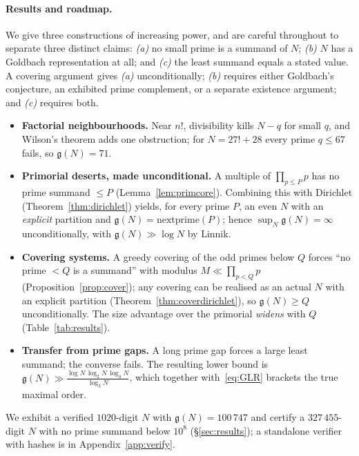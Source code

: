 \documentclass[11pt]{article}
\theoremstyle{plain}
\theoremstyle{definition}
\theoremstyle{remark}
\newcommand{\N}{N}
\newcommand{\g}{\mathfrak{g}}
\begin{document}
\paragraph{Results and roadmap.} We give three constructions of increasing power,
and are careful throughout to separate three distinct claims: \emph{(a)} no small
prime is a summand of $\N$; \emph{(b)} $\N$ has a Goldbach representation at all;
and \emph{(c)} the least summand equals a stated value. A covering argument gives
\emph{(a)} unconditionally; \emph{(b)} requires either Goldbach's conjecture, an
exhibited prime complement, or a separate existence argument; and \emph{(c)}
requires both.
\begin{itemize}
\item[\S\ref{sec:factorial}] \textbf{Factorial neighbourhoods.} Near $n!$,
divisibility kills $\N-q$ for small $q$, and Wilson's theorem adds one
obstruction; for $\N=27!+28$ every prime $q\le67$ fails, so $\g(\N)=71$.
\item[\S\ref{sec:primorial}] \textbf{Primorial deserts, made unconditional.} A
multiple of $\prod_{p\le P}p$ has no prime summand $\le P$
(Lemma~\ref{lem:primcore}). Combining this with Dirichlet
(Theorem~\ref{thm:dirichlet}) yields, for every prime $P$, an even $\N$ with an
\emph{explicit} partition and $\g(\N)=\mathrm{nextprime}(P)$; hence
$\sup_\N\g(\N)=\infty$ unconditionally, with $\g(\N)\gg\log \N$ by Linnik.
\item[\S\ref{sec:covering}] \textbf{Covering systems.} A greedy covering of the
odd primes below $Q$ forces ``no prime $<Q$ is a summand'' with modulus
$M\ll\prod_{p<Q}p$ (Proposition~\ref{prop:cover}); any covering can be realised
as an actual $\N$ with an explicit partition (Theorem~\ref{thm:coverdirichlet}),
so $\g(\N)\ge Q$ unconditionally. The size advantage over the primorial
\emph{widens} with $Q$ (Table~\ref{tab:results}).
\item[\S\ref{sec:gaps}] \textbf{Transfer from prime gaps.} A long prime gap
forces a large least summand; the converse fails. The resulting lower bound is
$\g(\N)\gg\frac{\log \N\,\log_2\N\,\log_4\N}{\log_3\N}$, which together
with~\eqref{eq:GLR} brackets the true maximal order.
\end{itemize}
We exhibit a verified $1020$-digit $\N$ with $\g(\N)=100\,747$ and certify a
$327\,455$-digit $\N$ with no prime summand below $10^8$
(\S\ref{sec:results}); a standalone verifier with hashes is in
Appendix~\ref{app:verify}.
\end{document}
